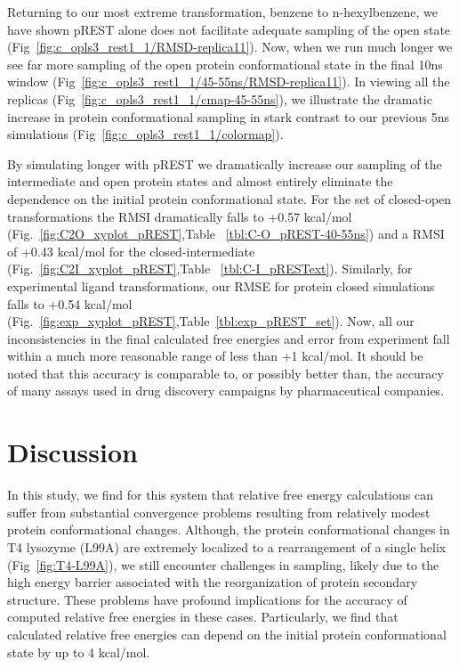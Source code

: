 \documentclass[journal=jctcce,manuscript=article]{achemso}
\begin{document}
Returning to our most extreme transformation, benzene to n-hexylbenzene, we have shown pREST alone does not facilitate adequate sampling of the open state (Fig~\ref{fig:c_opls3_rest1_1/RMSD-replica11}).
Now, when we run much longer we see far more sampling of the open protein conformational state in the final 10ns window (Fig~\ref{fig:c_opls3_rest1_1/45-55ns/RMSD-replica11}).\footnotemark
In viewing all the replicas (Fig~\ref{fig:c_opls3_rest1_1/cmap-45-55ns}), we illustrate the dramatic increase in protein conformational sampling in stark contrast to our previous 5ns simulations (Fig~\ref{fig:c_opls3_rest1_1/colormap}). 

By simulating longer with pREST we dramatically increase our sampling of the intermediate and open protein states and almost entirely eliminate the dependence on the initial protein conformational state.
For the set of closed-open transformations the RMSI dramatically falls to +0.57 kcal/mol (Fig.~\ref{fig:C2O_xyplot_pREST},Table ~\ref{tbl:C-O_pREST-40-55ns}) and a RMSI of +0.43 kcal/mol for the closed-intermediate (Fig.~\ref{fig:C2I_xyplot_pREST},Table ~\ref{tbl:C-I_pRESText}).
Similarly, for experimental ligand transformations, our RMSE for protein closed simulations falls to +0.54 kcal/mol (Fig.~\ref{fig:exp_xyplot_pREST},Table~\ref{tbl:exp_pREST_set}).
Now, all our inconsistencies in the final calculated free energies and error from experiment fall within a much more reasonable range of less than +1 kcal/mol.  
It should be noted that this accuracy is comparable to, or possibly better than, the accuracy of many assays used in drug discovery campaigns by pharmaceutical companies. 
 
\section{Discussion}
In this study, we find for this system that relative free energy calculations can suffer from substantial convergence problems resulting from relatively modest protein conformational changes.
Although, the protein conformational changes in T4 lysozyme (L99A) are extremely localized to a rearrangement of a single helix (Fig~\ref{fig:T4-L99A}), we still encounter challenges in sampling, likely due to the high energy barrier associated with the reorganization of protein secondary structure.
These problems have profound implications for the accuracy of computed relative free energies in these cases.
Particularly, we find that calculated relative free energies can depend on the initial protein conformational state by up to 4 kcal/mol.
\end{document}
